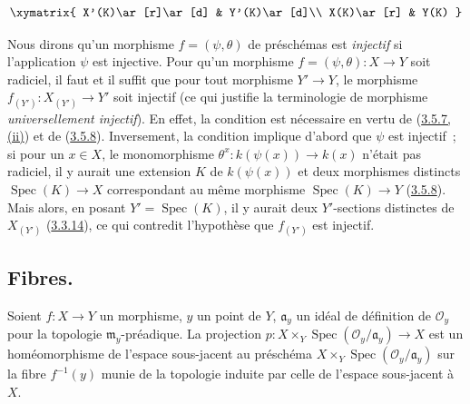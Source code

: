\label{I.3.5.10.base-change-points-diagram-fr}
\[
  \xymatrix{
    X'(K)\ar[r]\ar[d] & Y'(K)\ar[d]\\
    X(K)\ar[r] & Y(K)
  }
\]

\begin{remark}[3.5.11]
\label{I.3.5.11-fr}
Nous dirons qu'un morphisme $f=(\psi,\theta)$ de préschémas est
\emph{injectif} si l'application $\psi$ est injective. Pour qu'un morphisme
$f=(\psi,\theta):X\to Y$ soit radiciel, il faut et il suffit que pour tout
morphisme $Y'\to Y$, le morphisme $f_{(Y')}:X_{(Y')}\to Y'$ soit injectif (ce
qui justifie la terminologie de morphisme \emph{universellement injectif}). En
effet, la condition est nécessaire en vertu de
(\hyperref[I.3.5.7-fr]{3.5.7, (ii)}) et de
(\hyperref[I.3.5.8-fr]{3.5.8}). Inversement, la condition implique d'abord que
$\psi$ est injectif~; si pour un $x\in X$, le monomorphisme
$\theta^x:k(\psi(x))\to k(x)$ n'était pas radiciel, il y aurait une extension
$K$ de $k(\psi(x))$ et deux morphismes distincts
$\operatorname{Spec}(K)\to X$ correspondant au même morphisme
$\operatorname{Spec}(K)\to Y$ (\hyperref[I.3.5.8-fr]{3.5.8}). Mais alors, en
posant $Y'=\operatorname{Spec}(K)$, il y aurait deux $Y'$-sections distinctes
de $X_{(Y')}$ (\hyperref[I.3.3.14-fr]{3.3.14}), ce qui contredit l'hypothèse
que $f_{(Y')}$ est injectif.
\end{remark}

\subsection{Fibres.}
\label{subsection:I.3.6-fr}

\begin{proposition}[3.6.1]
\label{I.3.6.1-fr}
Soient $f:X\to Y$ un morphisme, $y$ un point de $Y$, $\mathfrak{a}_y$ un
idéal de définition de $\mathcal{O}_y$ pour la topologie
$\mathfrak{m}_y$-préadique. La projection
$p:X\times_Y\operatorname{Spec}(\mathcal{O}_y/\mathfrak{a}_y)\to X$ est un
homéomorphisme de l'espace sous-jacent au préschéma
$X\times_Y\operatorname{Spec}(\mathcal{O}_y/\mathfrak{a}_y)$ sur la fibre
$f^{-1}(y)$ munie de la topologie induite par celle de l'espace sous-jacent à
$X$.
\end{proposition}

